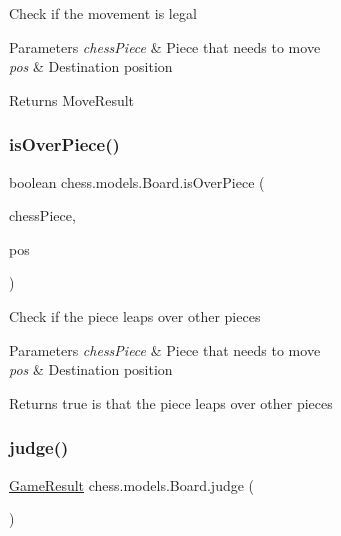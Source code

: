 Check if the movement is legal


\begin{DoxyParams}{Parameters}
{\em chess\+Piece} & Piece that needs to move \\
\hline
{\em pos} & Destination position \\
\hline
\end{DoxyParams}
\begin{DoxyReturn}{Returns}
Move\+Result 
\end{DoxyReturn}
\mbox{\label{classchess_1_1models_1_1_board_a8ffee6403d98b5e5e68c0a2b73440100}} 
\subsubsection{\texorpdfstring{is\+Over\+Piece()}{isOverPiece()}}
{\footnotesize\ttfamily boolean chess.\+models.\+Board.\+is\+Over\+Piece (\begin{DoxyParamCaption}\item[{\mbox{\hyperlink{classchess_1_1models_1_1_chess_piece}{Chess\+Piece}}}]{chess\+Piece,  }\item[{\mbox{\hyperlink{classchess_1_1models_1_1_position}{Position}}}]{pos }\end{DoxyParamCaption})}

Check if the piece leaps over other pieces


\begin{DoxyParams}{Parameters}
{\em chess\+Piece} & Piece that needs to move \\
\hline
{\em pos} & Destination position \\
\hline
\end{DoxyParams}
\begin{DoxyReturn}{Returns}
true is that the piece leaps over other pieces 
\end{DoxyReturn}
\mbox{\label{classchess_1_1models_1_1_board_a7e3f69e82d8337f3cf6109913e5335d3}} 
\subsubsection{\texorpdfstring{judge()}{judge()}}
{\footnotesize\ttfamily \mbox{\hyperlink{enumchess_1_1models_1_1enums_1_1_game_result}{Game\+Result}} chess.\+models.\+Board.\+judge (\begin{DoxyParamCaption}{ }\end{DoxyParamCaption})}

